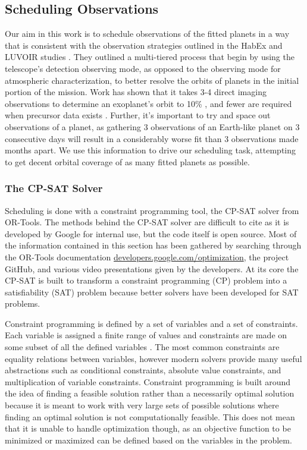 \subsection{Scheduling Observations}

Our aim in this work is to schedule observations of the fitted planets in a way
that is consistent with the observation strategies outlined in the HabEx and
LUVOIR studies \cite{gaudiHabitableExoplanetObservatory2020,TheLUVOIRTeam2019}.
They outlined a multi-tiered process that begin by using the telescope's
detection observing mode, as opposed to the observing mode for atmospheric
characterization, to better resolve the orbits of planets in the initial
portion of the mission. Work has shown that it takes 3-4 direct imaging
observations to determine an exoplanet's orbit to 10\%
\citep{bluntOrbitsImpatient2017}, and fewer are required when precursor data
exists \citep{gaudiHabitableExoplanetObservatory2020}. Further, it's important
to try and space out observations of a planet, as gathering 3 observations of
an Earth-like planet on 3 consecutive days will result in a considerably worse
fit than 3 observations made months apart. We use this information to drive our
scheduling task, attempting to get decent orbital coverage of as many fitted
planets as possible.

\subsubsection{The CP-SAT Solver}

Scheduling is done with a constraint programming tool, the CP-SAT solver from
OR-Tools\citep{perronORTools2022}. The methods behind the CP-SAT solver are
difficult to cite as it is developed by Google for internal use, but the code
itself is open source. Most of the information contained in this section has
been gathered by searching through the OR-Tools documentation
\url{developers.google.com/optimization}, the project GitHub, and various video
presentations given by the developers. At its core the CP-SAT is built to
transform a constraint programming (CP) problem into a satisfiability (SAT)
problem because better solvers have been developed for SAT problems. 

Constraint programming is defined by a set of variables and a set of
constraints. Each variable is assigned a finite range of values and constraints
are made on some subset of all the defined variables
\citep{shawConstraintProgramming2002}. The most common constraints are equality
relations between variables, however modern solvers provide many useful
abstractions such as conditional constraints, absolute value constraints, and
multiplication of variable constraints. Constraint programming is built around
the idea of finding a feasible solution rather than a necessarily optimal
solution because it is meant to work with very large sets of possible solutions
where finding an optimal solution is not computationally feasible. This does
not mean that it is unable to handle optimization though, as an objective
function to be minimized or maximized can be defined based on the variables in
the problem.

